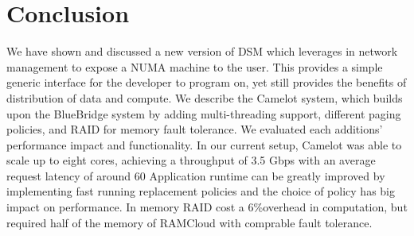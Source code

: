 \section{Conclusion}
\label{sec:conclusion}

We have shown and discussed a new version of DSM which leverages in network
management to expose a NUMA machine to the user. This provides a simple generic
interface for the developer to program on, yet still provides the benefits of
distribution of data and compute. We describe the Camelot system, which builds
upon the BlueBridge system by adding multi-threading support, different paging
policies, and RAID for memory fault tolerance. We evaluated each additions'
performance impact and functionality. In our current setup, Camelot was able to
scale up to eight cores, achieving a throughput of 3.5 Gbps with an average
request latency of around 60 Application runtime can be greatly improved by
implementing fast running replacement policies and the choice of policy has big
impact on performance.  In memory RAID cost a 6\%overhead in computation, but
required half of the memory of RAMCloud with comprable fault tolerance.


